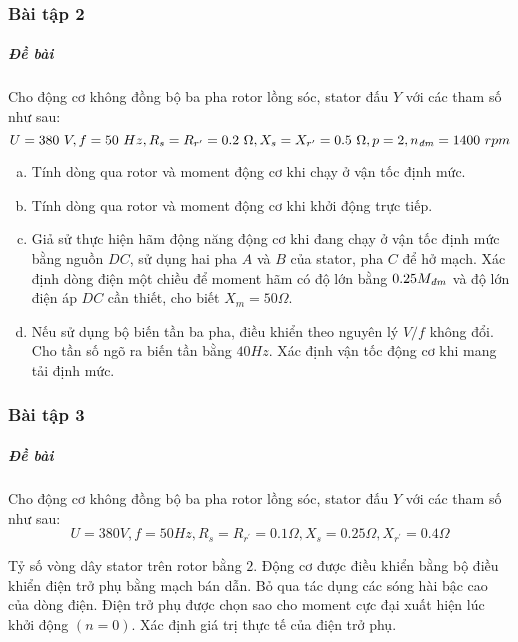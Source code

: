\documentclass[12pt,a4paper]{article}
\begin{document}
\subsubsection{Bài tập 2}
\subparagraph{Đề bài} Cho động cơ không đồng bộ ba pha rotor lồng sóc, stator đấu $Y$ với các tham số như sau: $$ U = 380 \unit{V}, f = 50 \unit{Hz}, R_s = R_{r^ \prime}  = 0.2 \unit{\Omega}, X_s = X_{r^ \prime}  = 0.5 \unit{\Omega}, p = 2, \vitalic{n} = 1400\unit{rpm}$$
\begin{enumerate}[a.]
\item Tính dòng qua rotor và moment động cơ khi chạy ở vận tốc định mức.
\item Tính dòng qua rotor và moment động cơ khi khởi động trực tiếp.
\item Giả sử thực hiện hãm động năng động cơ khi đang chạy ở vận tốc định mức bằng nguồn $DC$, sử dụng hai pha $A$ và $B$ của stator, pha $C$ để hở mạch. Xác định dòng điện một chiều để moment hãm có độ lớn bằng $0.25 \vitalic{M}$ và độ lớn điện áp $DC$ cần thiết, cho biết $X_m = 50 \unit{\Omega}$.
\item Nếu sử dụng bộ biến tần ba pha, điều khiển theo nguyên lý $V/f$ không đổi. Cho tần số ngõ ra biến tần bằng $40 \unit{Hz}$. Xác định vận tốc động cơ khi mang tải định mức.
\end{enumerate}
\subsubsection{Bài tập 3}
\subparagraph{Đề bài} Cho động cơ không đồng bộ ba pha rotor lồng sóc, stator đấu $Y$ với các tham số như sau: $$ U = 380 \unit{V}, f = 50 \unit{Hz}, R_s = R_{r^ \prime}  = 0.1 \unit{\Omega}, X_s = 0.25 \unit{\Omega}, X_{r^ \prime}  = 0.4 \unit{\Omega}$$

Tỷ số vòng dây stator trên rotor bằng $2$. Động cơ được điều khiển bằng bộ điều khiển điện trở phụ bằng mạch bán dẫn. Bỏ qua tác dụng các sóng hài bậc cao của dòng điện. Điện trở phụ được chọn sao cho moment cực đại xuất hiện lúc khởi động $(n=0)$. Xác định giá trị thực tế của điện trở phụ.
\end{document}
